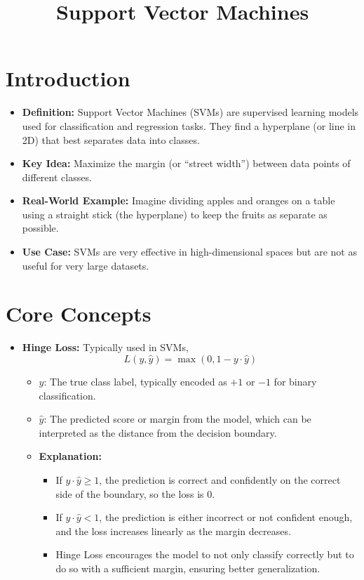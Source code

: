 \documentclass[10pt]{article}
\title{Support Vector Machines}
\author{}
\date{}
\begin{document}
\maketitle

\section{Introduction}
\begin{itemize}
    \item \textbf{Definition:} Support Vector Machines (SVMs) are supervised learning models used for classification and regression tasks. They find a hyperplane (or line in 2D) that best separates data into classes.
    \item \textbf{Key Idea:} Maximize the margin (or “street width”) between data points of different classes.
    \item \textbf{Real-World Example:} Imagine dividing apples and oranges on a table using a straight stick (the hyperplane) to keep the fruits as separate as possible.
    \item \textbf{Use Case:} SVMs are very effective in high-dimensional spaces but are not as useful for very large datasets.
\end{itemize}

\section{Core Concepts}

\begin{itemize}
    \item \textbf{Hinge Loss:} Typically used in SVMs,
    \[
    L(y, \hat{y}) = \max(0, 1 - y \cdot \hat{y})
    \]
    \begin{itemize}
        \item \( y \): The true class label, typically encoded as \( +1 \) or \( -1 \) for binary classification.
        \item \( \hat{y} \): The predicted score or margin from the model, which can be interpreted as the distance from the decision boundary.
        \item \textbf{Explanation:}
        \begin{itemize}
            \item If \( y \cdot \hat{y} \geq 1 \), the prediction is correct and confidently on the correct side of the boundary, so the loss is \( 0 \).
            \item If \( y \cdot \hat{y} < 1 \), the prediction is either incorrect or not confident enough, and the loss increases linearly as the margin decreases.
            \item Hinge Loss encourages the model to not only classify correctly but to do so with a sufficient margin, ensuring better generalization.
        \end{itemize}
    \end{itemize}
\end{itemize}
\end{document}
